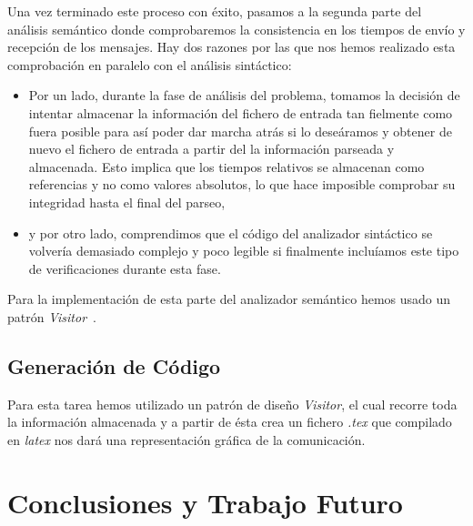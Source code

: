 \documentclass[12pt,a4paper]{report}
\begin{document}
Una vez terminado este proceso con éxito, pasamos a la segunda parte del análisis semántico donde comprobaremos la consistencia en los tiempos de envío y recepción de los mensajes. Hay dos razones por las que nos hemos realizado esta comprobación en paralelo con el análisis sintáctico:
\begin{itemize}
\item Por un lado, durante la fase de análisis del problema, tomamos la decisión de intentar almacenar la información del fichero de entrada tan fielmente como fuera posible para así poder dar marcha atrás si lo deseáramos y obtener de nuevo el fichero de entrada a partir del la información parseada y almacenada. Esto implica que los tiempos relativos se almacenan como referencias y no como valores absolutos, lo que hace imposible comprobar su integridad hasta el final del parseo,
\item y por otro lado, comprendimos que el código del analizador sintáctico se volvería demasiado complejo y poco legible si finalmente incluíamos este tipo de verificaciones durante esta fase.
\end{itemize}

Para la implementación de esta parte del analizador semántico hemos usado un patrón \textit{Visitor}~\cite{gof}.

\section{Generación de Código}

Para esta tarea hemos utilizado un patrón de diseño \textit{Visitor}, el cual recorre toda la información almacenada y a partir de ésta crea un fichero \textit{.tex} que compilado en \textit{latex} nos dará una representación gráfica de la comunicación.

\chapter{Conclusiones y Trabajo Futuro}
\label{ch:conclusiones}



\end{document}
